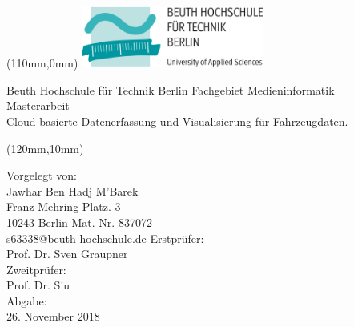 \begin{titlepage}
	\begin{textblock*}{0mm}(110mm,0mm)
			\includegraphics[width=60mm]{Abbildungen/Deckblatt-Beuth/Beuth_Logo.png}  
	\end{textblock*} 

\vspace*{4cm}
    
    \begin{cmssb}
    	\begin{flushleft}
    		\vspace*{10pt} 
    		\textsf{\fontsize{14}{0}\selectfont Beuth Hochschule für Technik Berlin  Fachgebiet Medieninformatik}\\
			\vspace*{10pt} 
			\textsf{\fontsize{30}{0}\selectfont Masterarbeit}\\
			\vspace*{10pt}
			\textcolor{tured}{\textsf{\fontsize{14}{0}\selectfont Cloud-basierte Datenerfassung und Visualisierung für Fahrzeugdaten.}}
		\end{flushleft}
	\end{cmssb}
 
\begin{textblock*}{60mm}(120mm,10mm)
    \begin{flushleft}
    	\begin{cmss}
    		\begin{normalsize}		
    			\textcolor{tugrey}{Vorgelegt von:}\\
				Jawhar Ben Hadj M'Barek\\
				Franz Mehring Platz. 3\\
				10243 Berlin \linebreak\linebreak
				Mat.-Nr. 837072\\
				s63338@beuth-hochschule.de
				\linebreak\linebreak\linebreak
				\textcolor{tugrey}{Erstprüfer:}\\
				Prof. Dr. Sven Graupner\\
				\textcolor{tugrey}{Zweitprüfer:}\\
				Prof. Dr. Siu\\
				\textcolor{tugrey}{Abgabe:}\\
				26. November 2018\linebreak\linebreak
			\end{normalsize}	
		\end{cmss}
    \end{flushleft}    
\end{textblock*} 	

\end{titlepage}

\newpage

\thispagestyle{empty}

